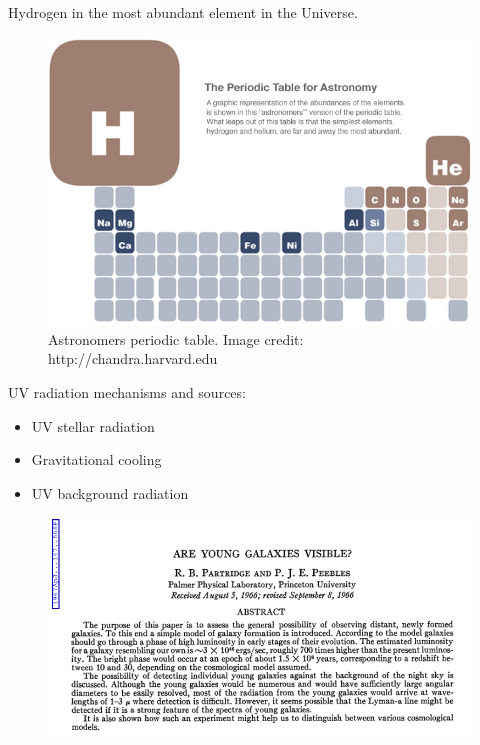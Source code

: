 \documentclass{beamer}
\begin{document}
\begin{frame}{Hydrogen in the most abundant element in the Universe.} 
\begin{figure}
\includegraphics[scale=0.3]{Figures/astronomy_table.jpg}
\caption{Astronomers periodic table. Image credit: http://chandra.harvard.edu}
\end{figure}
\end{frame}

\begin{frame}{UV radiation mechanisms and sources:}

\begin{itemize}
\item UV stellar radiation 
\item Gravitational cooling
\item UV background radiation
\end{itemize}

\end{frame}

\begin{frame}%
\begin{figure}
\includegraphics[scale=0.4]{Figures/PP.png}
\end{figure}
\end{frame}
\end{document}
